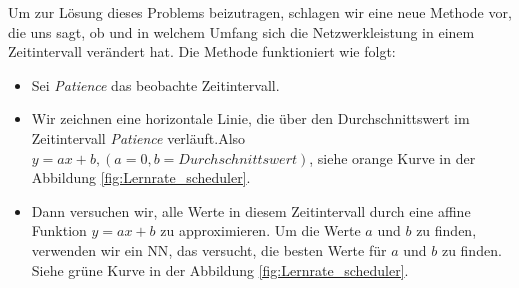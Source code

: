 \documentclass[12pt,a4paper]{scrartcl}
\numberwithin{equation}{section}
\begin{document}
 Um zur Lösung dieses Problems beizutragen, schlagen wir eine neue Methode vor, die uns sagt, ob und in welchem Umfang sich die Netzwerkleistung in einem Zeitintervall verändert hat. Die Methode funktioniert wie folgt:
\begin{itemize} 
		\item Sei \textit{Patience} das beobachte Zeitintervall.
		\item Wir zeichnen eine horizontale Linie, die über den Durchschnittswert im Zeitintervall \textit{Patience} verläuft.Also $ y = ax +b,( a=0, b= Durchschnittswert) $, siehe orange Kurve in der Abbildung \ref{fig:Lernrate_scheduler}.
		\item Dann versuchen wir, alle Werte in diesem Zeitintervall durch eine affine Funktion $ y=ax+b $ zu approximieren. Um die Werte $ a $ und $ b $ zu finden, verwenden wir ein \ac{NN}, das versucht, die besten Werte für $ a $ und $ b $ zu finden. Siehe grüne Kurve in der Abbildung \ref{fig:Lernrate_scheduler}.

\end{itemize}
\end{document}
